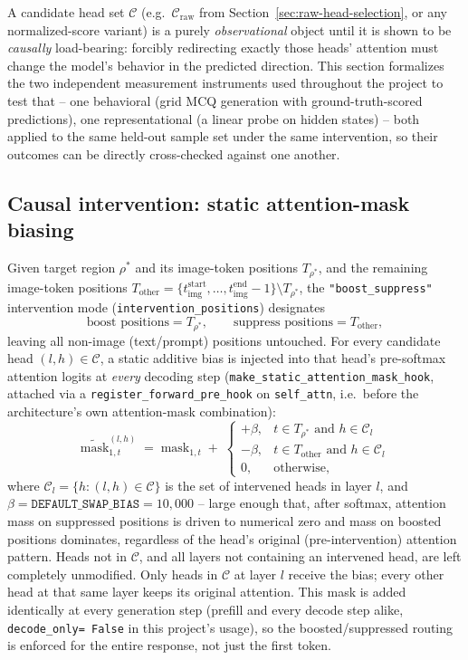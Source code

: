 A candidate head set $\mathcal{C}$ (e.g.\ $\mathcal{C}_{\text{raw}}$ from
Section~\ref{sec:raw-head-selection}, or any normalized-score variant) is a
purely \emph{observational} object until it is shown to be
\emph{causally} load-bearing: forcibly redirecting exactly those heads'
attention must change the model's behavior in the predicted direction. This
section formalizes the two independent measurement instruments used
throughout the project to test that -- one behavioral (grid MCQ generation
with ground-truth-scored predictions), one representational (a linear probe
on hidden states) -- both applied to the same held-out sample set under the
same intervention, so their outcomes can be directly cross-checked against
one another.

\subsection{Causal intervention: static attention-mask biasing}

Given target region $\rho^{*}$ and its image-token positions
$T_{\rho^{*}}$, and the remaining image-token positions
$T_{\text{other}} = \{t_{\text{img}}^{\text{start}},\dots,t_{\text{img}}^{\text{end}}-1\} \setminus T_{\rho^{*}}$,
the \texttt{"boost\_suppress"} intervention mode
(\texttt{intervention\_positions}) designates
\[
  \text{boost positions} = T_{\rho^{*}}, \qquad
  \text{suppress positions} = T_{\text{other}},
\]
leaving all non-image (text/prompt) positions untouched. For every candidate
head $(l,h) \in \mathcal{C}$, a static additive bias is injected into that
head's pre-softmax attention logits at \emph{every} decoding step
(\texttt{make\_static\_attention\_mask\_hook}, attached via a
\texttt{register\_forward\_pre\_hook} on \texttt{self\_attn}, i.e.\ before
the architecture's own attention-mask combination):
\[
  \widetilde{\text{mask}}^{(l,h)}_{1,t}
  \;=\;
  \text{mask}_{1,t}
  \;+\;
  \begin{cases}
    +\beta, & t \in T_{\rho^{*}} \text{ and } h \in \mathcal{C}_l \\
    -\beta, & t \in T_{\text{other}} \text{ and } h \in \mathcal{C}_l \\
    0, & \text{otherwise},
  \end{cases}
\]
where $\mathcal{C}_l = \{h : (l,h) \in \mathcal{C}\}$ is the set of
intervened heads in layer $l$, and $\beta = \texttt{DEFAULT\_SWAP\_BIAS} =
10{,}000$ -- large enough that, after softmax, attention mass on suppressed
positions is driven to numerical zero and mass on boosted positions
dominates, regardless of the head's original (pre-intervention) attention
pattern. Heads not in $\mathcal{C}$, and all layers not containing an
intervened head, are left completely unmodified. Only heads in
$\mathcal{C}$ at layer $l$ receive the bias; every other head at that same
layer keeps its original attention. This mask is added identically at every
generation step (prefill and every decode step alike, \texttt{decode\_only=
False} in this project's usage), so the boosted/suppressed routing is
enforced for the entire response, not just the first token.

